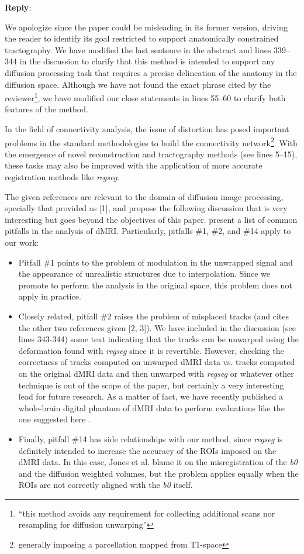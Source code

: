 \documentclass[9pt]{memoir}
\newcommand{\reply}{\par\fontshape{n}\selectfont \noindent \textbf{Reply}:\ }
\begin{document}
\reply{%
We apologize since the paper could be misleading in its former version, driving
  the reader to identify its goal restricted to support anatomically constrained
  tractography.
We have modified the last sentence in the abstract and lines 339--344 in the discussion to
  clarify that this method is intended to support any diffusion processing task that
  requires a precise delineation of the anatomy in the diffusion space.
Although we have not found the exact phrase cited by the reviewer\footnote{``this method avoids any
 requirement for collecting additional scans nor resampling for diffusion unwarping''},
 we have modified our close statements in lines 55--60 to clarify both features
 of the method.

In the field of connectivity analysis, the issue of distortion has posed important problems in the
  standard methodologies to build the connectivity network\footnote{generally imposing
  a parcellation mapped from T1-space}.
With the emergence of novel reconstruction and tractography methods (see lines 5--15),
  these tasks may also be improved with the application of more accurate registration
  methods like \emph{regseg}.

The given references are relevant to the domain of diffusion image processing,
  specially that provided as [1], and propose the following discussion that
  is very interesting but goes beyond the objectives of this paper.
\cite{jones_twentyfive_2010} present a list of common pitfalls in the
  analysis of dMRI.
Particularly, pitfalls \#1, \#2, and \#14 apply to our work:
\begin{itemize}
\item Pitfall \#1 points to the problem of modulation in the unwrapped signal and the
  appearance of unrealistic structures due to interpolation.
Since we promote to perform the analysis in the original space, this problem does not 
  apply in practice.
\item Closely related, pitfall \#2 raises the problem of misplaced tracks (and cites
  the other two references given [2, 3]).
We have included in the discussion (see lines 343-344) some text indicating that the tracks
  can be unwarped using the deformation found with \emph{regseg} since it is revertible.
However, checking the correctness of tracks computed on unwarped dMRI data vs. tracks computed
  on the original dMRI data and then unwarped with \emph{regseg} or whatever other
  technique is out of the scope of the paper, but certainly a very interesting lead for
  future research.
As a matter of fact, we have recently published a whole-brain digital phantom of dMRI 
  data \citep{esteban_diffantom_2016} to perform evaluations like the one suggested 
  here \citep[for instance, please see][Chapter 5]{esteban_image_2015}.
\item Finally, pitfall \#14 has side relationships with our method, since \emph{regseg} is
  definitely intended to increase the accuracy of the ROIs imposed on the dMRI data.
In this case, Jones et al. blame it on the misregistration of the \emph{b0} and the
  diffusion weighted volumes, but the problem applies equally when the ROIs are
  not correctly aligned with the \emph{b0} itself.
\end{itemize}
}
\end{document}
